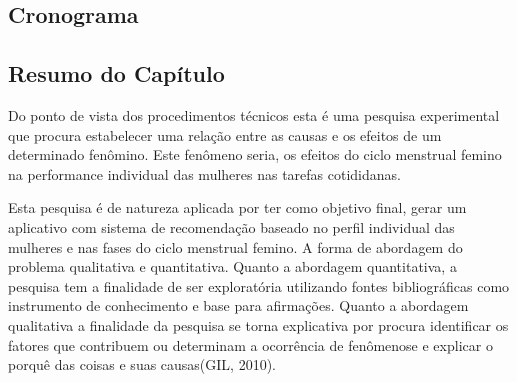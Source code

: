 \subsection{Cronograma}

\subsection{Resumo do Capítulo}

          
Do ponto de vista dos procedimentos técnicos esta é uma pesquisa 
experimental que procura estabelecer uma relação entre as causas e os efeitos de um determinado fenômino. Este fenômeno seria, os efeitos do ciclo menstrual femino na performance individual das mulheres nas tarefas cotididanas.

Esta pesquisa é de natureza aplicada por ter como objetivo final, gerar um aplicativo com sistema de recomendação baseado no perfil individual das mulheres e nas fases do ciclo menstrual femino. A forma de abordagem do problema qualitativa e quantitativa. Quanto a abordagem quantitativa, a pesquisa tem a finalidade de ser exploratória utilizando fontes bibliográficas como instrumento de conhecimento e base para afirmações. Quanto a abordagem qualitativa a finalidade da pesquisa se torna explicativa por procura identificar os fatores que contribuem ou determinam a ocorrência de fenômenose e explicar o porquê das coisas e suas causas(GIL, 2010).

